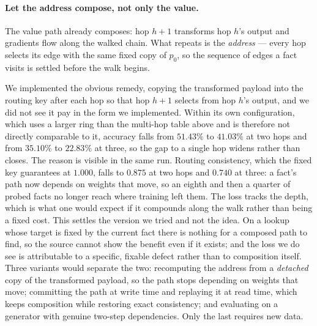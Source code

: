 \documentclass[11pt,a4paper]{article}
\begin{document}
\paragraph{Let the address compose, not only the value.}
The value path already composes: hop $h+1$ transforms hop $h$'s output and
gradients flow along the walked chain. What repeats is the \emph{address} ---
every hop selects its edge with the same fixed copy of $p_0$, so the sequence
of edges a fact visits is settled before the walk begins.

We implemented the obvious remedy, copying the transformed payload into the
routing key after each hop so that hop $h+1$ selects from hop $h$'s output, and
we did not see it pay in the form we implemented. Within its own
configuration, which uses a larger ring
than the multi-hop table above and is therefore not directly comparable to it,
accuracy falls from $51.43\%$ to $41.03\%$ at two hops and from $35.10\%$ to
$22.83\%$ at three, so the gap to a single hop widens rather than closes. The
reason is visible in the same run. Routing consistency, which the fixed key
guarantees at $1.000$, falls to $0.875$ at two hops and $0.740$ at three: a
fact's path now depends on weights that move, so an eighth and then a quarter
of probed facts no longer reach where training left them. The loss tracks the
depth, which is what one would expect if it compounds along the walk rather
than being a fixed cost. This settles the version we tried and not the idea. On a lookup whose target is
fixed by the current fact there is nothing for a composed path to find, so the
source cannot show the benefit even if it exists; and the loss we do see is
attributable to a specific, fixable defect rather than to composition itself.
Three variants would separate the two: recomputing the address from a
\emph{detached} copy of the transformed payload, so the path stops depending on
weights that move; committing the path at write time and replaying it at read
time, which keeps composition while restoring exact consistency; and evaluating
on a generator with genuine two-step dependencies. Only the last requires new
data.
\end{document}
